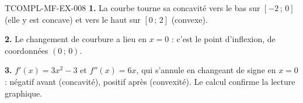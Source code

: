 \begin{corrige}{TCOMPL-MF-EX-008}
\textbf{1.} La courbe tourne sa concavité vers le bas sur $[-2\,;\,0]$ (elle
y est concave) et vers le haut sur $[0\,;\,2]$ (convexe).

\textbf{2.} Le changement de courbure a lieu en $x=0$ : c'est le point
d'inflexion, de coordonnées $(0\,;\,0)$.

\textbf{3.} $f'(x)=3x^2-3$ et $f''(x)=6x$, qui s'annule en changeant de signe
en $x=0$ : négatif avant (concavité), positif après (convexité). Le calcul
confirme la lecture graphique.
\end{corrige}

